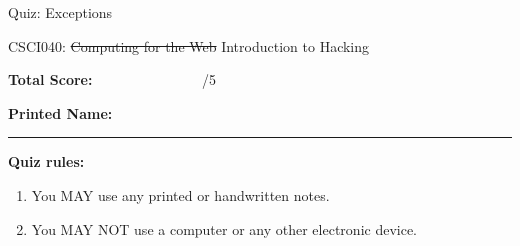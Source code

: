 \documentclass[10pt]{article}
\theoremstyle{definition}
\newtheorem{problem}{Problem}
\begin{document}
\begin{center}
    {
\Large
Quiz: Exceptions
}

    \vspace{0.1in}
    CSCI040: \sout{Computing for the Web} Introduction to Hacking

    \vspace{0.1in}
\end{center}

\vspace{0.15in}
\noindent
\textbf{Total Score:} ~~~~~~~~~~~~~~~/5

\vspace{0.5in}
\noindent
\textbf{Printed Name:}

\noindent
\rule{\textwidth}{0.1pt}
\vspace{0.25in}

\noindent
\textbf{Quiz rules:}
\begin{enumerate}
    \item You MAY use any printed or handwritten notes.
    \item You MAY NOT use a computer or any other electronic device.
\end{enumerate}

\noindent

\vspace{0.15in}


%
%
\end{document}
